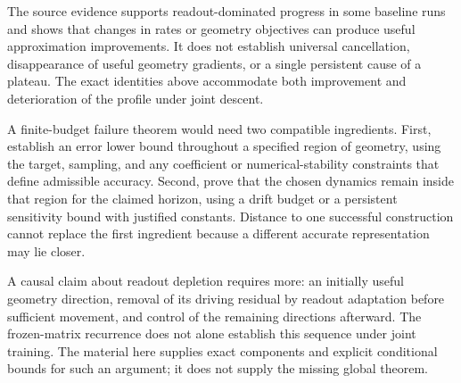 \documentclass[11pt]{article}
\theoremstyle{remark}
\begin{document}
The source evidence supports readout-dominated progress in some baseline runs and shows that changes in rates or geometry objectives can produce useful approximation improvements. It does not establish universal cancellation, disappearance of useful geometry gradients, or a single persistent cause of a plateau. The exact identities above accommodate both improvement and deterioration of the profile under joint descent.

A finite-budget failure theorem would need two compatible ingredients. First, establish an error lower bound throughout a specified region of geometry, using the target, sampling, and any coefficient or numerical-stability constraints that define admissible accuracy. Second, prove that the chosen dynamics remain inside that region for the claimed horizon, using a drift budget or a persistent sensitivity bound with justified constants. Distance to one successful construction cannot replace the first ingredient because a different accurate representation may lie closer.

A causal claim about readout depletion requires more: an initially useful geometry direction, removal of its driving residual by readout adaptation before sufficient movement, and control of the remaining directions afterward. The frozen-matrix recurrence does not alone establish this sequence under joint training. The material here supplies exact components and explicit conditional bounds for such an argument; it does not supply the missing global theorem.
\end{document}
